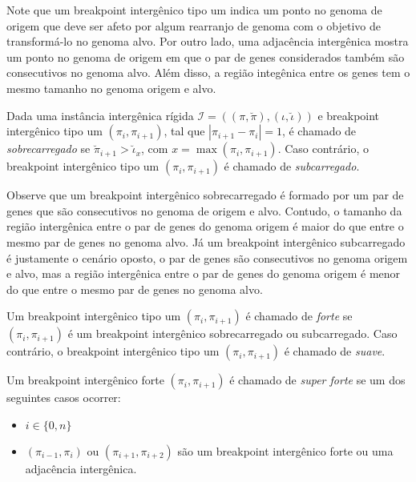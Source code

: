 Note que um breakpoint intergênico tipo um indica um ponto no genoma de origem que deve ser afeto por algum rearranjo de genoma com o objetivo de transformá-lo no genoma alvo. Por outro lado, uma adjacência intergênica mostra um ponto no genoma de origem em que o par de genes considerados também são consecutivos no genoma alvo. Além disso, a região integênica entre os genes tem o mesmo tamanho no genoma origem e alvo.

\begin{definition}
  Dada uma instância intergênica rígida $\mathcal{I} = ((\pi,\breve\pi),(\iota,\breve\iota))$ e breakpoint intergênico tipo um $(\pi_{i}, \pi_{i+1})$, tal que $|\pi_{i+1} - \pi_{i}| = 1$, é chamado de \emph{sobrecarregado} se $\breve\pi_{i+1} > \breve\iota_{x}$, com $x = \max(\pi_{i}, \pi_{i+1})$. Caso contrário, o breakpoint intergênico tipo um $(\pi_{i}, \pi_{i+1})$ é chamado de \emph{subcarregado}.
\end{definition}

Observe que um breakpoint intergênico sobrecarregado é formado por um par de genes que são consecutivos no genoma de origem e alvo. Contudo, o tamanho da região intergênica entre o par de genes do genoma origem é maior do que entre o mesmo par de genes no genoma alvo. Já um breakpoint intergênico subcarregado é justamente o cenário oposto, o par de genes são consecutivos no genoma origem e alvo, mas a região intergênica entre o par de genes do genoma origem é menor do que entre o mesmo par de genes no genoma alvo.

\begin{definition}
  Um breakpoint intergênico tipo um $(\pi_{i}, \pi_{i+1})$ é chamado de \emph{forte} se $(\pi_{i}, \pi_{i+1})$ é um breakpoint intergênico sobrecarregado ou subcarregado. Caso contrário, o breakpoint intergênico tipo um $(\pi_{i}, \pi_{i+1})$ é chamado de \emph{suave}.
\end{definition}

\begin{definition}
  Um breakpoint intergênico forte $(\pi_{i}, \pi_{i+1})$ é chamado de \emph{super forte} se um dos seguintes casos ocorrer:
  \begin{itemize}
    \item $i \in \{0,n\}$
    \item $(\pi_{i-1}, \pi_{i})$ ou $(\pi_{i+1}, \pi_{i+2})$ são um breakpoint intergênico forte ou uma adjacência intergênica.
  \end{itemize}
\end{definition}

